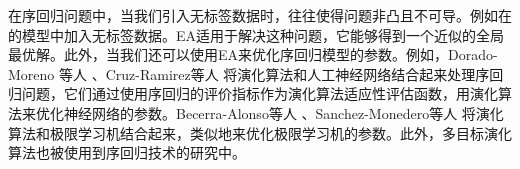 在序回归问题中，当我们引入无标签数据时，往往使得问题非凸且不可导。例如在\citep{chu2005new}\citep{sun2010kernel}的模型中加入无标签数据。EA适用于解决这种问题，它能够得到一个近似的全局最优解。此外，当我们还可以使用EA来优化序回归模型的参数。例如，Dorado-Moreno 等人\citep{dorado2012ordinal}
、Cruz-Ramirez等人\citep{cruz2014metrics}\citep{cruz2013multiobjective}
将演化算法和人工神经网络结合起来处理序回归问题，它们通过使用序回归的评价指标作为演化算法适应性评估函数，用演化算法来优化神经网络的参数。Becerra-Alonso等人\citep{becerra2012evolutionary}
、Sanchez-Monedero等人\citep{sanchez2013evolutionary}
将演化算法和极限学习机结合起来，类似地来优化极限学习机的参数。此外，多目标演化算法\citep{deb2001multi}也被使用到序回归技术的研究中\citep{cruz2013multiobjective}\citep{cruz2014metrics}。



